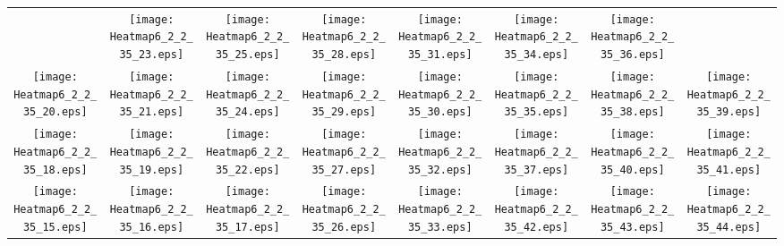 \documentclass{standalone}
\begin{document}
\renewcommand{\arraystretch}{0}
\setlength{\tabcolsep}{0pt}
\begin{tabular}{ *8{c} }
 & \texttt{[image: Heatmap6\_2\_2\_35\_23.eps]} & \texttt{[image: Heatmap6\_2\_2\_35\_25.eps]} & \texttt{[image: Heatmap6\_2\_2\_35\_28.eps]} & \texttt{[image: Heatmap6\_2\_2\_35\_31.eps]} & \texttt{[image: Heatmap6\_2\_2\_35\_34.eps]} & \texttt{[image: Heatmap6\_2\_2\_35\_36.eps]} &  \\
\texttt{[image: Heatmap6\_2\_2\_35\_20.eps]} & \texttt{[image: Heatmap6\_2\_2\_35\_21.eps]} & \texttt{[image: Heatmap6\_2\_2\_35\_24.eps]} & \texttt{[image: Heatmap6\_2\_2\_35\_29.eps]} & \texttt{[image: Heatmap6\_2\_2\_35\_30.eps]} & \texttt{[image: Heatmap6\_2\_2\_35\_35.eps]} & \texttt{[image: Heatmap6\_2\_2\_35\_38.eps]} & \texttt{[image: Heatmap6\_2\_2\_35\_39.eps]} \\
\texttt{[image: Heatmap6\_2\_2\_35\_18.eps]} & \texttt{[image: Heatmap6\_2\_2\_35\_19.eps]} & \texttt{[image: Heatmap6\_2\_2\_35\_22.eps]} & \texttt{[image: Heatmap6\_2\_2\_35\_27.eps]} & \texttt{[image: Heatmap6\_2\_2\_35\_32.eps]} & \texttt{[image: Heatmap6\_2\_2\_35\_37.eps]} & \texttt{[image: Heatmap6\_2\_2\_35\_40.eps]} & \texttt{[image: Heatmap6\_2\_2\_35\_41.eps]} \\
\texttt{[image: Heatmap6\_2\_2\_35\_15.eps]} & \texttt{[image: Heatmap6\_2\_2\_35\_16.eps]} & \texttt{[image: Heatmap6\_2\_2\_35\_17.eps]} & \texttt{[image: Heatmap6\_2\_2\_35\_26.eps]} & \texttt{[image: Heatmap6\_2\_2\_35\_33.eps]} & \texttt{[image: Heatmap6\_2\_2\_35\_42.eps]} & \texttt{[image: Heatmap6\_2\_2\_35\_43.eps]} & \texttt{[image: Heatmap6\_2\_2\_35\_44.eps]} \\

\end{tabular}
\end{document}
